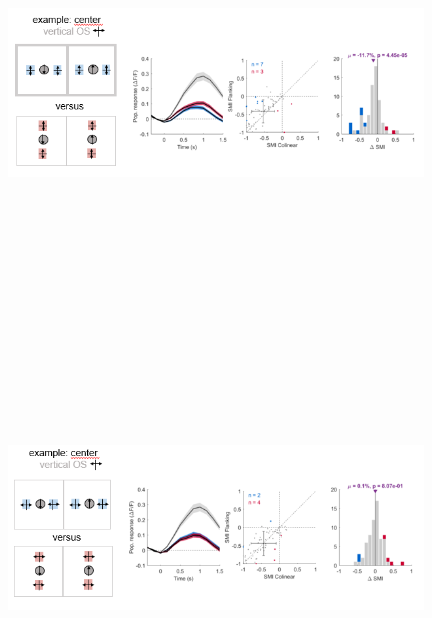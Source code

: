 \begin{figure}[H] \centering \includegraphics[width=11cm,height=11cm,keepaspectratio]{Figures/7.Results/finalPopulation/sel/diagrams/15.png} 
\end{figure}

\begin{figure}[H] \centering \includegraphics[width=11cm,height=11cm,keepaspectratio]{Figures/7.Results/finalPopulation/sel/diagrams/16.png} 
\end{figure}

